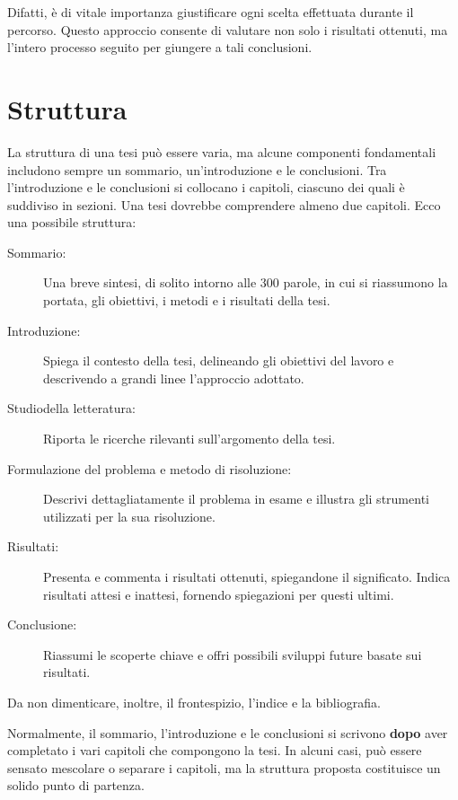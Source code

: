 \documentclass{article}
\begin{document}
Difatti, è di vitale importanza giustificare ogni scelta effettuata durante il percorso. Questo approccio consente di valutare non solo i risultati ottenuti, ma l’intero processo seguito per giungere a tali conclusioni.

\section{Struttura}
La struttura di una tesi può essere varia, ma alcune componenti fondamentali includono sempre un sommario, un’introduzione e le conclusioni. Tra l’introduzione e le conclusioni si collocano i capitoli, ciascuno dei quali è suddiviso in sezioni. Una tesi dovrebbe comprendere almeno due capitoli. Ecco una possibile struttura:
\begin{description}
\item[Sommario:] Una breve sintesi, di solito intorno alle 300 parole, in cui si riassumono la portata, gli obiettivi, i metodi e i risultati della tesi.
\item[Introduzione:] Spiega il contesto della tesi, delineando gli obiettivi del lavoro e descrivendo a grandi linee l’approccio adottato.
\item[Studiodella letteratura:] Riporta le ricerche rilevanti sull’argomento della tesi.
\item[Formulazione del problema e metodo di risoluzione:]  Descrivi dettagliatamente il problema in esame e illustra gli strumenti utilizzati per la sua risoluzione.
\item[Risultati:] Presenta e commenta i risultati ottenuti, spiegandone il significato. Indica risultati attesi e inattesi, fornendo spiegazioni per questi ultimi.
\item[Conclusione:] Riassumi le scoperte chiave e offri possibili sviluppi future basate sui risultati.
\end{description}
Da non dimenticare, inoltre, il frontespizio, l’indice e la bibliografia.

Normalmente, il sommario, l’introduzione e le conclusioni si scrivono \textbf{dopo} aver completato i vari capitoli che compongono la tesi. In alcuni casi, può essere sensato mescolare o separare i capitoli, ma la struttura proposta costituisce un solido punto di partenza.
\end{document}
